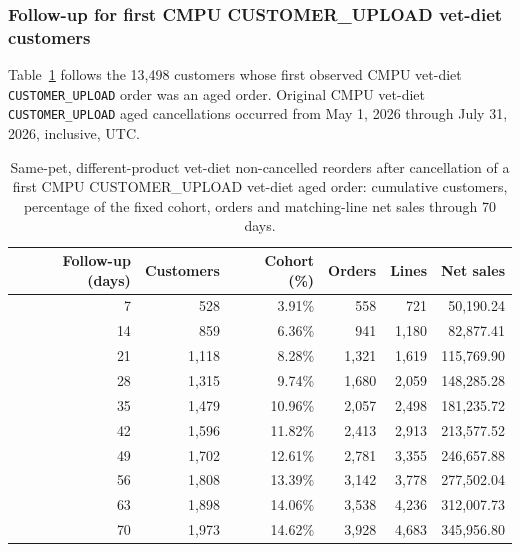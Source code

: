 \clearpage
\subsubsection{Follow-up for first CMPU CUSTOMER\_UPLOAD vet-diet customers}
Table~\ref{tab:financial-opportunity-new-upload-same-pet-different-part} follows the
13,498 customers whose first observed CMPU vet-diet
\texttt{CUSTOMER\_UPLOAD} order was an aged order. Original CMPU vet-diet
\texttt{CUSTOMER\_UPLOAD} aged cancellations occurred from
May 1, 2026 through July 31, 2026, inclusive, UTC.

\begin{table}[!htbp]
\centering
\caption{Same-pet, different-product vet-diet non-cancelled reorders after cancellation of a first CMPU CUSTOMER\_UPLOAD vet-diet aged order: cumulative customers, percentage of the fixed cohort, orders and matching-line net sales through 70 days.}
\label{tab:financial-opportunity-new-upload-same-pet-different-part}
\begin{tabular}{@{}rrrrrr@{}}
\toprule
Follow-up (days) & Customers & Cohort (\%) & Orders & Lines & Net sales \\
\midrule
7 & 528 & 3.91\% & 558 & 721 & 50,190.24 \\
14 & 859 & 6.36\% & 941 & 1,180 & 82,877.41 \\
21 & 1,118 & 8.28\% & 1,321 & 1,619 & 115,769.90 \\
28 & 1,315 & 9.74\% & 1,680 & 2,059 & 148,285.28 \\
35 & 1,479 & 10.96\% & 2,057 & 2,498 & 181,235.72 \\
42 & 1,596 & 11.82\% & 2,413 & 2,913 & 213,577.52 \\
49 & 1,702 & 12.61\% & 2,781 & 3,355 & 246,657.88 \\
56 & 1,808 & 13.39\% & 3,142 & 3,778 & 277,502.04 \\
63 & 1,898 & 14.06\% & 3,538 & 4,236 & 312,007.73 \\
70 & 1,973 & 14.62\% & 3,928 & 4,683 & 345,956.80 \\
\bottomrule
\end{tabular}


\end{table}
